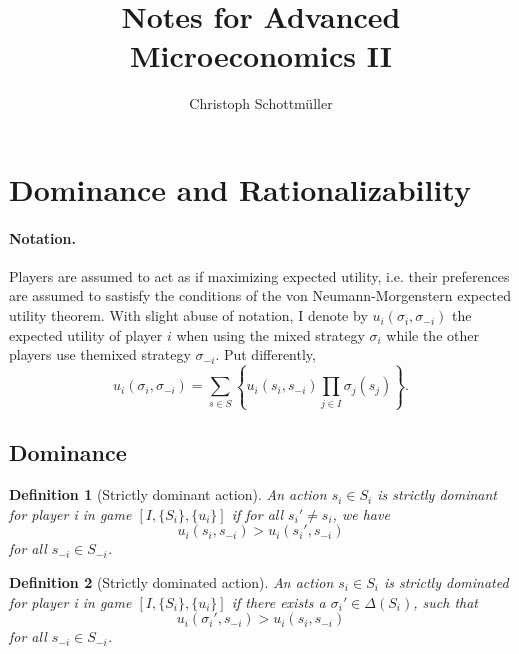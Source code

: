 \documentclass[a4paper,11pt]{article}
\title{Notes for Advanced Microeconomics II}
\author{Christoph Schottmüller}
\newtheorem{definition}{Definition}
\begin{document}
\maketitle

\section{Dominance and Rationalizability}
\label{sec:domin-ratio}

\paragraph{Notation. }Players are assumed to act as if maximizing expected utility, i.e. their preferences are assumed to sastisfy the conditions of the von Neumann-Morgenstern expected utility theorem. With slight abuse of notation, I denote by $u_i(\sigma_i,\sigma_{-i})$ the expected utility of player $i$ when using the mixed strategy $\sigma_i$ while the other players use themixed strategy $\sigma_{-i}$. Put differently,
\begin{equation*}
  u_i(\sigma_i,\sigma_{-i})=\sum_{s\in S} \left\{u_i(s_i,s_{-i}) \prod_{j\in I}\sigma_j(s_j) \right\}.
\end{equation*}

\subsection{Dominance}
\label{sec:dominance}

\begin{definition}[Strictly dominant action]
An action \(s_i\in S_i\) is \emph{strictly dominant} for player i in game \([I,\{S_i\},\{u_i\}]\) if for all \(s_i'\neq s_i\), we have
$$u_i(s_i,s_{-i})>u_i(s_i',s_{-i})$$
for all \(s_{-i}\in S_{-i}\).
\end{definition}

\begin{definition}[Strictly dominated action]
An action \(s_i\in S_i\) is \emph{strictly dominated} for player i in game \([I,\{S_i\},\{u_i\}]\) if there exists a \(\sigma_i'\in\Delta(S_i)\), such that
$$u_i(\sigma_i',s_{-i})>u_i(s_i,s_{-i})$$
for all \(s_{-i}\in S_{-i}\).
\end{definition}
\end{document}
